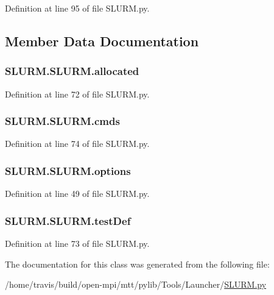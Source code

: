 Definition at line 95 of file S\-L\-U\-R\-M.\-py.



\subsection{Member Data Documentation}
\hypertarget{class_s_l_u_r_m_1_1_s_l_u_r_m_aee4130d6ff2007d08fad045aedd69781}{
\subsubsection[{allocated}]{\setlength{\rightskip}{0pt plus 5cm}S\-L\-U\-R\-M.\-S\-L\-U\-R\-M.\-allocated}}\label{class_s_l_u_r_m_1_1_s_l_u_r_m_aee4130d6ff2007d08fad045aedd69781}


Definition at line 72 of file S\-L\-U\-R\-M.\-py.

\hypertarget{class_s_l_u_r_m_1_1_s_l_u_r_m_ab755a940fd09c8fa416c177f692d31d6}{
\subsubsection[{cmds}]{\setlength{\rightskip}{0pt plus 5cm}S\-L\-U\-R\-M.\-S\-L\-U\-R\-M.\-cmds}}\label{class_s_l_u_r_m_1_1_s_l_u_r_m_ab755a940fd09c8fa416c177f692d31d6}


Definition at line 74 of file S\-L\-U\-R\-M.\-py.

\hypertarget{class_s_l_u_r_m_1_1_s_l_u_r_m_a652a43986b8bda5c6ddb866ab0513ac8}{
\subsubsection[{options}]{\setlength{\rightskip}{0pt plus 5cm}S\-L\-U\-R\-M.\-S\-L\-U\-R\-M.\-options}}\label{class_s_l_u_r_m_1_1_s_l_u_r_m_a652a43986b8bda5c6ddb866ab0513ac8}


Definition at line 49 of file S\-L\-U\-R\-M.\-py.

\hypertarget{class_s_l_u_r_m_1_1_s_l_u_r_m_a9b08ef79e039a8524f1fa6712b45182b}{
\subsubsection[{test\-Def}]{\setlength{\rightskip}{0pt plus 5cm}S\-L\-U\-R\-M.\-S\-L\-U\-R\-M.\-test\-Def}}\label{class_s_l_u_r_m_1_1_s_l_u_r_m_a9b08ef79e039a8524f1fa6712b45182b}


Definition at line 73 of file S\-L\-U\-R\-M.\-py.



The documentation for this class was generated from the following file\-:\begin{DoxyCompactItemize}
\item 
/home/travis/build/open-\/mpi/mtt/pylib/\-Tools/\-Launcher/\hyperlink{_s_l_u_r_m_8py}{S\-L\-U\-R\-M.\-py}\end{DoxyCompactItemize}
